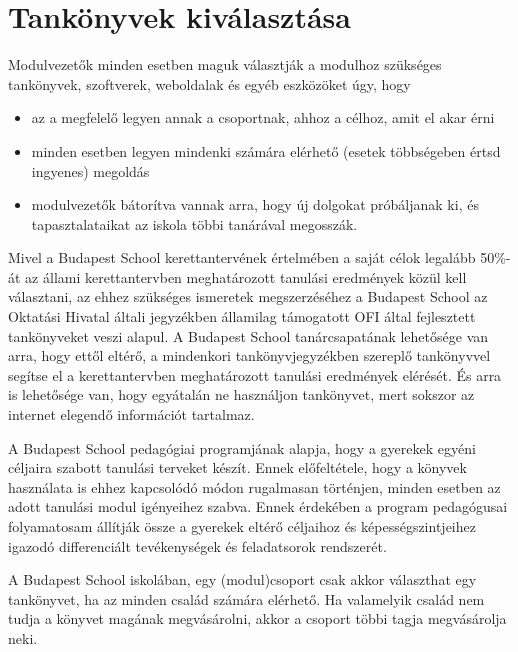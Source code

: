 \section{Tankönyvek kiválasztása}
\label{sec:tankonyvek}

Modulvezetők minden esetben maguk választják a modulhoz szükséges tankönyvek, szoftverek, weboldalak és egyéb eszközöket úgy, hogy

\begin{itemize}

      \item
            az a megfelelő legyen annak a csoportnak, ahhoz a célhoz, amit el akar érni
      \item
            minden esetben legyen mindenki számára elérhető (esetek többségeben értsd ingyenes) megoldás
      \item
            modulvezetők bátorítva vannak arra, hogy új dolgokat próbáljanak ki, és tapasztalataikat az iskola többi tanárával megosszák.
\end{itemize}

Mivel a Budapest School kerettantervének értelmében a saját célok legalább 50\%-át az állami kerettantervben meghatározott tanulási eredmények közül kell választani, az ehhez szükséges ismeretek megszerzéséhez a Budapest School az Oktatási Hivatal általi jegyzékben államilag támogatott OFI által fejlesztett tankönyveket veszi alapul. A Budapest School tanárcsapatának lehetősége van arra, hogy ettől eltérő, a mindenkori tankönyvjegyzékben szereplő tankönyvvel segítse el a kerettantervben meghatározott tanulási eredmények elérését. És arra is lehetősége van, hogy egyátalán ne használjon tankönyvet, mert sokszor az internet elegendő információt tartalmaz.

A Budapest School pedagógiai programjának alapja, hogy a gyerekek egyéni céljaira szabott tanulási terveket készít. Ennek előfeltétele, hogy a könyvek használata is ehhez kapcsolódó módon rugalmasan történjen, minden esetben az adott tanulási modul igényeihez szabva. Ennek érdekében a program pedagógusai folyamatosam állítják össze a gyerekek eltérő céljaihoz és képességszintjeihez igazodó differenciált tevékenységek és feladatsorok rendszerét.

A Budapest School iskolában, egy (modul)csoport csak akkor választhat egy tankönyvet, ha az minden család számára elérhető. Ha valamelyik család nem tudja a könyvet magának megvásárolni, akkor a csoport többi tagja megvásárolja neki.